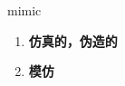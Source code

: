 
\begin{frame}
{\huge mimic}
\begin{center}
\begin{enumerate}\Large
  \item \textbf{仿真的，伪造的}
  \item \textbf{模仿}
\end{enumerate}
\end{center}
\end{frame}
